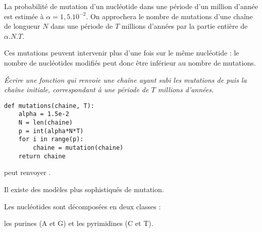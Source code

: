 \medskip

La probabilité de mutation d'un nucléotide dans une période d'un million d'année est estimée à $\alpha = 1,5.10^{-2}$.
On approchera le nombre de mutations d'une chaîne de longueur $N$ dans une période de $T$ millions d'années par la partie entière de $\alpha.N.T$. 

Ces mutations peuvent intervenir plus d'une fois sur le même nucléotide : le nombre de nucléotides modifiés peut donc être inférieur au nombre de mutations.
\begin{Exercise}\it 
Écrire une fonction  qui renvoie une chaîne ayant subi les mutations de puis la chaîne initiale, correspondant à une période de $T$ millions d'années.
\end{Exercise}
\begin{Answer}
\begin{lstlisting}
def mutations(chaine, T):
    alpha = 1.5e-2
    N = len(chaine)
    p = int(alpha*N*T)
    for i in range(p):
        chaine = mutation(chaine)
    return chaine
\end{lstlisting}
\end{Answer}
 peut renvoyer .
\medskip

Il existe des modèles plus sophistiqués de mutation.

Les nucléotides sont décomposées en deux classes : 

les purines (A et G) et les pyrimidines (C et T). 


